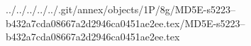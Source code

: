 ../../../../../.git/annex/objects/1P/8g/MD5E-s5223--b432a7cda08667a2d2946ca0451ae2ee.tex/MD5E-s5223--b432a7cda08667a2d2946ca0451ae2ee.tex
